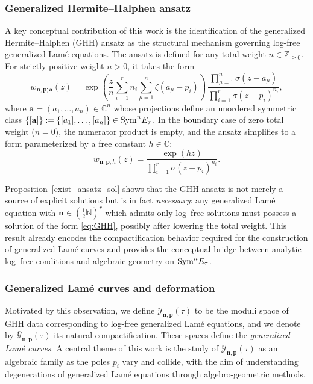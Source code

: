 \documentclass[11pt]{amsart}
\theoremstyle{remark}
\numberwithin{equation}{section}
\newcommand{\Sym}{{\rm Sym}}
\begin{document}
\subsubsection{Generalized Hermite--Halphen ansatz}
A key conceptual contribution of this work is the identification of the generalized Hermite--Halphen (GHH) ansatz as the structural mechanism governing log-free generalized Lam\'e equations. The ansatz is defined for any total weight $n \in \mathbb{Z}_{\geq 0}$. For strictly positive weight $n>0$, it takes the form
\begin{equation}\label{eq:GHH}
w_{\mathbf{n},\mathbf{p} ; \mathbf{a}}(z)=
\exp\!\left(
\frac{z}{n}\sum_{i=1}^r n_i\sum_{\mu=1}^n\zeta(a_\mu-p_i)
\right)\,
\frac{\prod_{\mu=1}^n\sigma(z-a_\mu)}
{\prod_{i=1}^r\sigma(z-p_i)^{n_i}},
\end{equation}
where $\mathbf{a} = (a_1,\dots,a_n) \in \mathbb{C}^n$ whose projections define an unordered symmetric class $\{[\mathbf{a}]\} := \{[a_1], \dots, [a_n]\} \in \Sym^n E_\tau$. In the boundary case of zero total weight ($n=0$), the numerator product is empty, and the ansatz simplifies to a form parameterized by a free constant $h \in \mathbb{C}$:
\begin{equation}\label{eq:GHH_zero}
w_{\mathbf{n},\mathbf{p}; h}(z)= \frac{\exp(hz)} {\prod_{i=1}^r\sigma(z-p_i)^{n_i}}.
\end{equation}

Proposition~\ref{exist_ansatz_sol} shows that the GHH ansatz is not merely a source of explicit solutions but is in fact \emph{necessary}: any generalized Lamé equation with $\mathbf{n} \in (\frac12 \mathbb{N})^r$ which admits only log–free solutions must possess a solution of the form \eqref{eq:GHH}, possibly after lowering the total weight. This result already encodes the compactification behavior required for the construction of generalized Lamé curves and provides the conceptual bridge between analytic log–free conditions and algebraic geometry on $\Sym^n E_\tau$.

\subsubsection{Generalized Lam\'e curves and deformation}
Motivated by this observation, we define $\mathcal{Y}_{\mathbf{n},\mathbf{p}}(\tau)$ to be the moduli space of GHH data corresponding to log-free generalized Lam\'e equations, and we denote by $\overline{\mathcal{Y}}_{\mathbf{n}, \mathbf{p}}(\tau)$ its natural compactification. These spaces define the \emph{generalized Lam\'e curves}. A central theme of this work is the study of $\overline{\mathcal{Y}}_{\mathbf{n},\mathbf{p}}(\tau)$ as an algebraic family as the poles $p_i$ vary and collide, with the aim of understanding degenerations of generalized Lam\'e equations through algebro-geometric methods.
\end{document}
